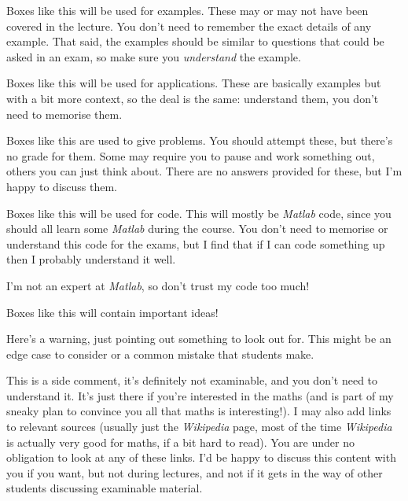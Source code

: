 \documentclass[fleqn]{LectureClass/LectureClass}
\begin{document}
    \begin{exm}{}{}
        Boxes like this will be used for examples.
        These may or may not have been covered in the lecture.
        You don't need to remember the exact details of any example.
        That said, the examples should be similar to questions that could be asked in an exam, so make sure you \emph{understand} the example.
    \end{exm}
    
    \begin{app}{}{}
        Boxes like this will be used for applications.
        These are basically examples but with a bit more context, so the deal is the same: understand them, you don't need to memorise them.
    \end{app}
    
    \begin{problem}{}{}
        Boxes like this are used to give problems.
        You should attempt these, but there's no grade for them.
        Some may require you to pause and work something out, others you can just think about.
        There are no answers provided for these, but I'm happy to discuss them.
    \end{problem}
    
    \begin{cde}{}{}
        Boxes like this will be used for code.
        This will mostly be \textit{Matlab} code, since you should all learn some \textit{Matlab} during the course.
        You don't need to memorise or understand this code for the exams, but I find that if I can code something up then I probably understand it well.
        
        I'm not an expert at \textit{Matlab}, so don't trust my code too much!
    \end{cde}
    
    \begin{important}
        Boxes like this will contain important ideas!
    \end{important}
    
    \begin{wrn}
        Here's a warning, just pointing out something to look out for.
        This might be an edge case to consider or a common mistake that students make.
    \end{wrn}
    
    \begin{remark}{}{}
        This is a side comment, it's definitely not examinable, and you don't need to understand it.
        It's just there if you're interested in the maths (and is part of my sneaky plan to convince you all that maths is interesting!).
        I may also add links to relevant sources (usually just the \textit{Wikipedia} page, most of the time \textit{Wikipedia} is actually very good for maths, if a bit hard to read).
        You are under no obligation to look at any of these links.
        I'd be happy to discuss this content with you if you want, but not during lectures, and not if it gets in the way of other students discussing examinable material.
    \end{remark}
    
\end{document}
